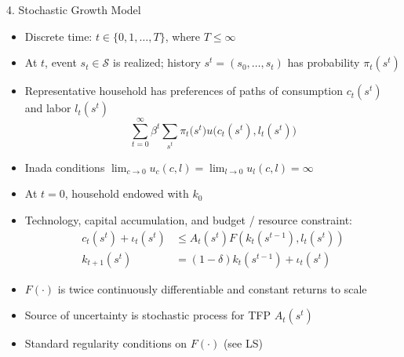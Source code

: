 \documentclass[10pt]{beamer}
\begin{document}
\begin{frame}{4. Stochastic Growth Model}
\begin{itemize}
\item Discrete time: $t \in \{0, 1, \ldots, T\}$, where $T \leq \infty$

\item At $t$, event $s_t \in \mathcal{S}$ is realized; history $s^t = (s_0, \ldots, s_t)$ has probability $\pi_t(s^t)$

\item Representative household has preferences of paths of consumption $c_t(s^t)$ and labor $l_t(s^t)$ 
\begin{equation*}
	\sum_{t=0}^\infty \beta^t \sum_{s^t} \pi_t\Big(s^t \Big) u \Big( c_t(s^t), l_t(s^t) \Big)
\end{equation*}

\item Inada conditions $\lim_{c\to 0} u_c(c, l) = \lim_{l\to0} u_l (c, l) = \infty$

\item At $t=0$, household endowed with $k_0$
\end{itemize}
\end{frame}


\begin{frame}{}
\begin{itemize}
\item Technology, capital accumulation, and budget / resource constraint:
\begin{align*}
	c_t(s^t) + \iota_t(s^t) &\leq A_t(s^t) F(k_t(s^{t-1}), l_t(s^t)) \\
	k_{t+1}(s^t) &= (1-\delta) k_t(s^{t-1}) + \iota_t(s^t)
\end{align*}

\item $F(\cdot)$ is twice continuously differentiable and constant returns to scale

\item Source of uncertainty is stochastic process for TFP $A_t(s^t)$

\item Standard regularity conditions on $F(\cdot)$ (see LS)
\end{itemize}
\end{frame}
\end{document}

